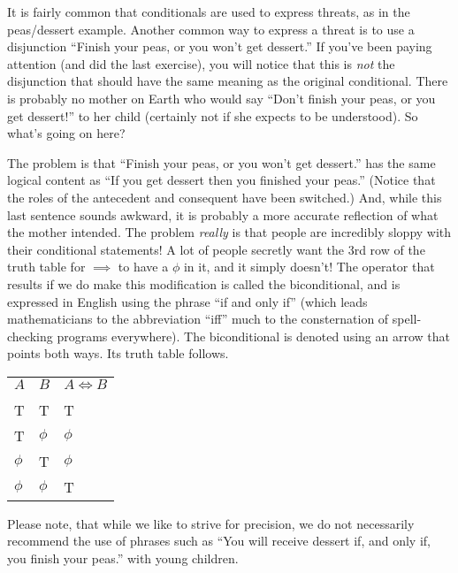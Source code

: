 \documentclass[10pt,]{book}
\theoremstyle{plain}
\theoremstyle{definition}
\theoremstyle{definition}
\numberwithin{equation}{section}
\newcommand{\hrulethin}  {\noalign{\hrule height 0.04em}}
\begin{document}
    It is fairly common that conditionals are used to express threats,
    as in the peas/dessert example. Another common way to express a
    threat is to use a disjunction \textemdash{} ``Finish your peas, or you won't
    get dessert.'' If you've been paying attention (and did the last
    exercise), you will notice that this is \emph{not} the disjunction
    that should have the same meaning as the original conditional.
    There is probably no mother on Earth who would say
    ``Don't finish your peas, or you get dessert!'' to her child
    (certainly not if she expects to be understood). So what's going on
    here?
\par

    The problem is that ``Finish your peas, or you won't
    get dessert.'' has the same logical content as
    ``If you get dessert then you finished your peas.''
    (Notice that the roles of the antecedent and consequent have been
    switched.) And, while this last sentence sounds awkward, it is
    probably a more accurate reflection of what the mother intended.
    The problem \emph{really} is that people are incredibly sloppy
    with their conditional statements! A lot of people secretly want
    the 3rd row of the truth table for \(\implies\) to have a \(\phi\)
    in it, and it simply doesn't! The operator that results if we do
    make this modification is called the 
    biconditional, and is expressed
    in English using the phrase ``if and only if'' (which leads mathematicians
    to the abbreviation ``iff'' much to the consternation of
    spell-checking programs everywhere). The biconditional is denoted
    using an arrow that points both ways. Its truth table follows.
\begin{tabular}{lll}
\(A\)&\(B\)&\(A \iff B\)\tabularnewline[0pt]
&&\tabularnewline\hrulethin
T&T&T\tabularnewline[0pt]
T&\(\phi\)&\(\phi\)\tabularnewline[0pt]
\(\phi\)&T&\(\phi\)\tabularnewline[0pt]
\(\phi\)&\(\phi\)&T
\end{tabular}
\par

    Please note, that while we like to strive for precision, we do not
    necessarily recommend the use of phrases such as
    ``You will receive dessert if, and only if,
    you finish your peas.'' with young children.
\par
\end{document}
